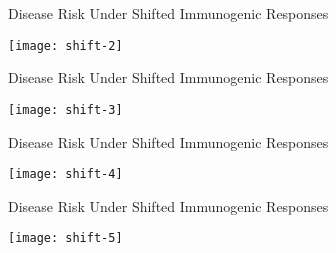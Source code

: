 \documentclass{beamer}
\begin{document}

\begin{frame}[c]{Disease Risk Under Shifted Immunogenic Responses}

\hspace*{-1cm}\texttt{[image: shift-2]}

\note{
}

\end{frame}


\begin{frame}[c]{Disease Risk Under Shifted Immunogenic Responses}

\hspace*{-1cm}\texttt{[image: shift-3]}

\note{
}

\end{frame}


\begin{frame}[c]{Disease Risk Under Shifted Immunogenic Responses}

\hspace*{-1cm}\texttt{[image: shift-4]}

\note{
}

\end{frame}


\begin{frame}[c]{Disease Risk Under Shifted Immunogenic Responses}

\hspace*{-1cm}\texttt{[image: shift-5]}

\note{
}

\end{frame}


\end{document}
